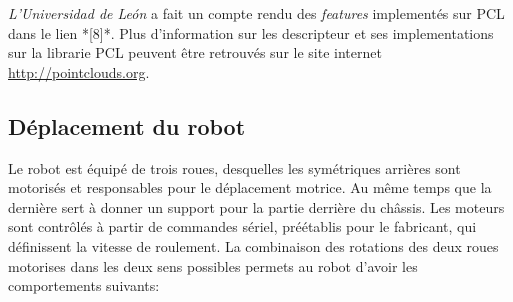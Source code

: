 \begin{figure}[H]
\end{figure}


\textit{L'Universidad de León } a fait un compte rendu des
\textit{features} implementés sur PCL dans le lien *[8]*. Plus
d'information sur les descripteur et ses implementations sur la
librarie PCL peuvent être retrouvés sur le site
internet \url{http://pointclouds.org}.

\subsection{Déplacement du robot}

Le robot est équipé de trois roues, desquelles les symétriques
arrières sont motorisés et responsables pour le déplacement
motrice. Au même temps que la dernière sert à donner un support pour
la partie derrière du châssis. Les moteurs sont contrôlés à
partir de commandes sériel, préétablis pour le fabricant, qui
définissent la vitesse de roulement. La combinaison des rotations
des deux roues motorises dans les deux sens possibles permets au
robot d'avoir les comportements suivants:


